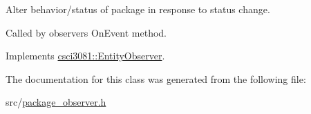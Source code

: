 Alter behavior/status of package in response to status change. 

Called by observer\textquotesingle{}s On\+Event method. 

Implements \hyperlink{classcsci3081_1_1EntityObserver_ad3188f03b6e68961ffcc415526795867}{csci3081\+::\+Entity\+Observer}.



The documentation for this class was generated from the following file\+:\begin{DoxyCompactItemize}
\item 
src/\hyperlink{package__observer_8h}{package\+\_\+observer.\+h}\end{DoxyCompactItemize}

